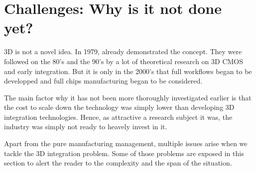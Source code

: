 \documentclass[11pt,a4paper]{report} %
\theoremstyle{customdef}
\begin{document}

\chapter{Challenges: Why is it not done yet?}\label{chap:challenges}
3D is not a novel idea. In 1979, \citet{Geis1979} already demonstrated the concept.
They were followed on the 80's \citep{Akasaka1986, Colinge1981, Goeloe1981, Kawamura1983, Kunio1989, Nakano1984, Nishimura1987, Sugahara1986, Terui1983} and the 90's \citep{Neudeck1999, Saraswat1999, Strickland1998, Subramanian1998} by a lot of theoretical research on 3D CMOS and early integration.
But it is only in the 2000's \citep{Souri2000} that full workflows began to be developped and full chips manufacturing began to be considered.

The main factor why it has not been more thoroughly investigated earlier is that the cost to scale down the technology was simply lower than developing 3D integration technologies.
Hence, as attractive a research subject it was, the industry was simply not ready to heavely invest in it.

Apart from the pure manufacturing management, multiple issues arise when we tackle the 3D integration problem.
Some of those problems are exposed in this section to alert the reader to the complexity and the span of the situation.

\end{document}
